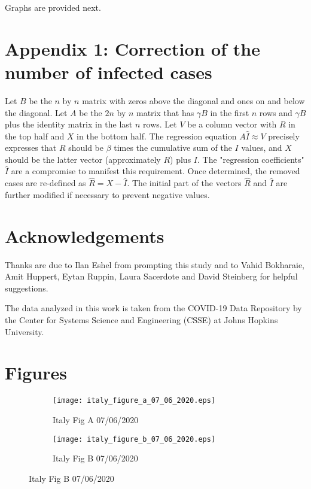 \documentclass{article}
\begin{document}
{Graphs are provided next.

\section{Appendix 1: Correction of the number of infected cases}

Let $B$ be the $n$ by $n$ matrix with zeros above the diagonal and ones on and below the diagonal. Let $A$ be the $2 n$ by $n$ matrix that has $\gamma B$ in the first $n$ rows and $\gamma B$ plus the identity matrix in the last $n$ rows. Let $V$ be a column vector with $R$ in the top half and $X$ in the bottom half. The regression equation $A \hat{I} \approx V$
precisely expresses that $R$ should be $\beta$ times the cumulative sum of the $I$ values, and $X$ should be the latter vector (approximately $R$) plus $I$. The "regression coefficients" $\hat{I}$ are a compromise to manifest this requirement. Once determined, the removed cases are re-defined as $\hat{R}=X-\hat{I}$. The initial part of the vectors $\hat{R}$ and $\hat{I}$ are further modified if necessary to prevent negative values.




\section*{Acknowledgements}

Thanks are due to Ilan Eshel from prompting this study and to Vahid
Bokharaie, Amit Huppert, Eytan Ruppin, Laura Sacerdote and David Steinberg for helpful suggestions.

The data analyzed in this work is taken from the COVID-19 Data Repository by
the Center for Systems Science and Engineering (CSSE) at Johns Hopkins
University.

\section{Figures}

\begin{figure}[htb]
\centering
    \begin{subfigure}{0.5\textwidth}
        \texttt{[image: italy\_figure\_a\_07\_06\_2020.eps]}
        \caption{Italy Fig A 07/06/2020}
        \label{fig:italy_figure_a_07_06_2020}
    \end{subfigure}%
        \begin{subfigure}{0.5\textwidth}                                   
	\texttt{[image: italy\_figure\_b\_07\_06\_2020.eps]}
        \caption{Italy Fig B 07/06/2020}
        \label{fig:italy_figure_b_07_06_2020}
    \end{subfigure}
\end{figure}

}
\end{document}
